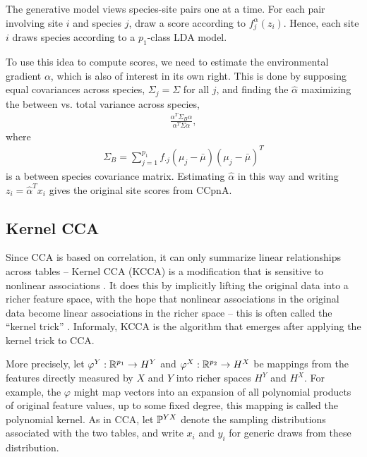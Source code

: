 \documentclass{article}
\begin{document}
The generative model views species-site pairs one at a time. For each pair
involving site $i$ and species $j$, draw a score according to
$f_{j}^{\alpha}\left(z_{i}\right)$. Hence, each site $i$ draws species according
to a $p_{1}$-class LDA model.

To use this idea to compute scores, we need to estimate the environmental
gradient $\alpha$, which is also of interest in its own right. This is done by
supposing equal covariances across species, $\Sigma_{j} = \Sigma$ for all $j$,
and finding the $\hat{\alpha}$ maximizing the between vs. total variance across
species,
\begin{align*}
  \frac{\alpha^{T} \Sigma_{B} \alpha}{\alpha^{T} \Sigma \alpha},
\end{align*}
where
\begin{align*}
  \Sigma_{B} = \sum_{j = 1}^{p_{1}} f_{\cdot j}\left(\mu_{j} -
  \bar{\mu}\right)\left(\mu_{j} - \bar{\mu}\right)^{T}
\end{align*}
is a between species covariance matrix. Estimating $\hat{\alpha}$ in this way
and writing $z_{i} = \hat{\alpha}^{T}x_{i}$ gives the original site scores from
CCpnA.

\subsection{Kernel CCA}
\label{subsec:kernel_cca}

Since CCA is based on correlation, it can only summarize linear relationships
across tables -- Kernel CCA (KCCA) is a modification that is sensitive to
nonlinear associations \citep{akaho2006kernel, bach2003kernel,
  lanckriet2004statistical}. It does this by implicitly lifting the original
data into a richer feature space, with the hope that nonlinear associations in
the original data become linear associations in the richer space -- this is
often called the ``kernel trick'' \citep{scholkopf2001kernel}. Informaly, KCCA
is the algorithm that emerges after applying the kernel trick to CCA.

More precisely, let $\varphi^{Y}: \reals^{p_{1}} \to H^{Y}$ and $\varphi^{X}:
\reals^{p_{2}} \to H^{X}$ be mappings from the features directly measured by $X$
and $Y$ into richer spaces $H^{Y}$ and $H^{X}$. For example, the $\varphi$ might
map vectors into an expansion of all polynomial products of original feature
values, up to some fixed degree, this mapping is called the polynomial kernel.
As in CCA, let $\P^{YX}$ denote the sampling distributions associated with the
two tables, and write $x_{i}$ and $y_{i}$ for generic draws from these
distribution.
\end{document}

